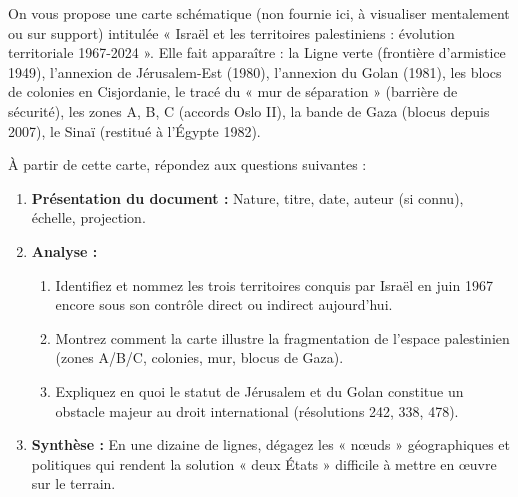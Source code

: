 \documentclass[11pt]{article}
\begin{document}
\begin{exercice}
On vous propose une carte schématique (non fournie ici, à visualiser mentalement ou sur support) intitulée « Israël et les territoires palestiniens : évolution territoriale 1967-2024 ». Elle fait apparaître : la Ligne verte (frontière d'armistice 1949), l'annexion de Jérusalem-Est (1980), l'annexion du Golan (1981), les blocs de colonies en Cisjordanie, le tracé du « mur de séparation » (barrière de sécurité), les zones A, B, C (accords Oslo II), la bande de Gaza (blocus depuis 2007), le Sinaï (restitué à l'Égypte 1982).

À partir de cette carte, répondez aux questions suivantes :
\begin{enumerate}
    \item \textbf{Présentation du document :} Nature, titre, date, auteur (si connu), échelle, projection.
    \item \textbf{Analyse :}
    \begin{enumerate}
        \item Identifiez et nommez les trois territoires conquis par Israël en juin 1967 encore sous son contrôle direct ou indirect aujourd'hui.
        \item Montrez comment la carte illustre la fragmentation de l'espace palestinien (zones A/B/C, colonies, mur, blocus de Gaza).
        \item Expliquez en quoi le statut de Jérusalem et du Golan constitue un obstacle majeur au droit international (résolutions 242, 338, 478).
    \end{enumerate}
    \item \textbf{Synthèse :} En une dizaine de lignes, dégagez les « nœuds » géographiques et politiques qui rendent la solution « deux États » difficile à mettre en œuvre sur le terrain.
\end{enumerate}
\end{exercice}
\end{document}
